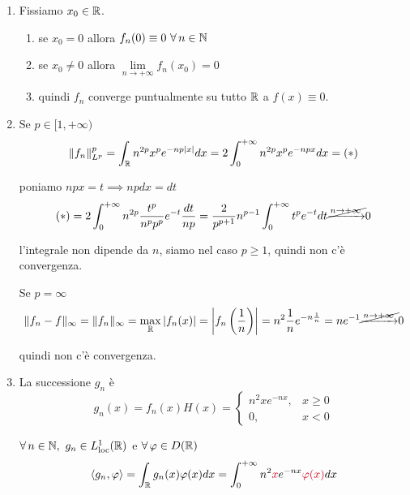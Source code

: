 \begin{enumerate}
\item Fissiamo $x_{0} \in \mathbb{R} $.
\begin{enumerate}
\item se $x_{0} = 0$ allora $f_{n}(0) \equiv 0\ \forall n\in \NN $
\item se $x_{0} \neq 0$ allora $\lim\limits _{n\rightarrow + \infty } f_{n}(x_{0}) = 0$
\item quindi $f_{n}$ converge puntualmente su tutto $\mathbb{R} $ a $f(x) \equiv 0$.
\end{enumerate}

\item Se $p\in [ 1, + \infty)$\begin{equation*}
\Vert f_{n}\Vert ^{p}_{L^{p}} = \int _{\mathbb{R} } n^{2p} x^{p} e^{ - np| x| } dx = 2\int ^{ + \infty }_{0} n^{2p} x^{p} e^{ - npx} dx = (*)
\end{equation*}

poniamo $npx = t\implies npdx = dt$\begin{equation*}
(*) = 2\int ^{ + \infty }_{0} n^{2p}\frac{t^{p}}{n^{p} p^{p}} e^{ - t}\frac{dt}{np} = \frac{2}{p^{p + 1}} n^{p - 1}\int ^{ + \infty }_{0} t^{p} e^{ - t} dt\cancel{\xrightarrow{n\rightarrow + \infty }} 0
\end{equation*}

l'integrale non dipende da $n$, siamo nel caso $p\geqslant 1$, quindi non c'è convergenza.

Se $p = \infty $\begin{equation*}
\Vert f_{n} - f\Vert _{\infty } = \Vert f_{n}\Vert _{\infty } = \max_{\mathbb{R} }| f_{n}(x)| = \left| f_{n}\left(\frac{1}{n}\right)\right| = n^{2}\frac{1}{n} e^{ - n\frac{1}{n}} = ne^{ - 1}\cancel{\xrightarrow{n\rightarrow + \infty }} 0
\end{equation*}

quindi non c'è convergenza.
\item La successione $g_{n}$ è\begin{equation*}
g_{n}(x) = f_{n}(x) H(x) = \begin{cases}
n^{2} xe^{ - nx} , & x\geqslant 0\\
0, & x < 0
\end{cases}
\end{equation*}

$\forall n\in \NN  ,\ g_{n} \in L^{1}_{\loc}(\RR)$ e $\forall \varphi \in D(\RR)$\begin{equation*}
\langle g_{n} ,\varphi \rangle = \int _{\RR } g_{n}(x) \varphi (x) dx = \int ^{ + \infty }_{0} n^{2}\textcolor[rgb]{0.82,0.01,0.11}{x} e^{ - nx}\textcolor[rgb]{0.82,0.01,0.11}{\varphi }\textcolor[rgb]{0.82,0.01,0.11}{(}\textcolor[rgb]{0.82,0.01,0.11}{x}\textcolor[rgb]{0.82,0.01,0.11}{)} dx
\end{equation*}


\end{enumerate}
